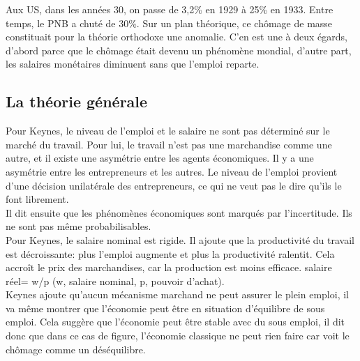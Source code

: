 \documentclass[10pt, a4paper, openany]{book}
\begin{document}
Aux US, dans les années 30, on passe de 3,2\% en 1929 à 25\% en 1933. Entre temps, le PNB a chuté de 30\%. Sur un plan théorique, ce chômage de masse constituait pour la théorie orthodoxe une anomalie. C'en est une à deux égards, d'abord parce que le chômage était devenu un phénomène mondial, d'autre part, les salaires monétaires diminuent sans que l'emploi reparte. 

\subsection{La théorie générale}

Pour Keynes, le niveau de l'emploi et le salaire ne sont pas déterminé sur le marché du travail. Pour lui, le travail n'est pas une marchandise comme une autre, et il existe une asymétrie entre les agents économiques. Il y a une asymétrie entre les entrepreneurs et les autres. Le niveau de l'emploi provient d'une décision unilatérale des entrepreneurs, ce qui ne veut pas le dire qu'ils le font librement. \\
Il dit ensuite que les phénomènes économiques sont marqués par l'incertitude. Ils ne sont pas même probabilisables. \\
Pour Keynes, le salaire nominal est rigide. Il ajoute que la productivité du travail est décroissante: plus l'emploi augmente et plus la productivité ralentit. Cela accroît le prix des marchandises, car la production est moins efficace. salaire réel= w/p (w, salaire nominal, p, pouvoir d'achat). \\
Keynes ajoute qu'aucun mécanisme marchand ne peut assurer le plein emploi, il va même montrer que l'économie peut être en situation d'équilibre de sous emploi. Cela suggère que l'économie peut être stable avec du sous emploi, il dit donc que dans ce cas de figure, l'économie classique ne peut rien faire car voit le chômage comme un déséquilibre. 
\end{document}
